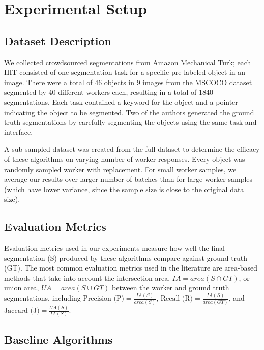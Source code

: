 \section{Experimental Setup\label{sec:experiment_setup}}

\subsection{Dataset Description\label{dataset}}
\par \noindent We collected crowdsourced segmentations from Amazon Mechanical Turk; each HIT consisted of one segmentation task for a specific pre-labeled object in an image. There were a total of 46 objects in 9 images from the MSCOCO dataset~\cite{Lin2014} segmented by 40 different workers each, resulting in a total of 1840 segmentations. Each task contained a keyword for the object and a pointer indicating the object to be segmented. Two of the authors generated the ground truth segmentations by carefully segmenting the objects using the same task and interface. 
\par A sub-sampled dataset was created from the full dataset to determine the efficacy of these algorithms on varying number of worker responses. Every object was randomly sampled worker with replacement. For small worker samples, we average our results over larger number of batches than for large worker samples (which have lower variance, since the sample size is close to the original data size).

\subsection{Evaluation Metrics}
\par \noindent Evaluation metrics used in our experiments measure how well the final segmentation (S) produced by these algorithms compare against ground truth (GT). The most common evaluation metrics used in the literature\cite{Cabezas2015,Sameki2015,Song2018,Lin2014} are area-based methods that take into account the intersection area, $IA=area(S\cap GT)$, or union area, $UA=area(S\cup GT)$ between the worker and ground truth segmentations, including %
    $\text{Precision (P)} = \frac{IA(S)}{area(S)}$, 
    $\text{Recall (R)} = \frac{IA(S)}{area(GT)}$, and 
    $\text{Jaccard (J)} = \frac{UA(S)}{IA(S)}$.
\subsection{Baseline Algorithms}


